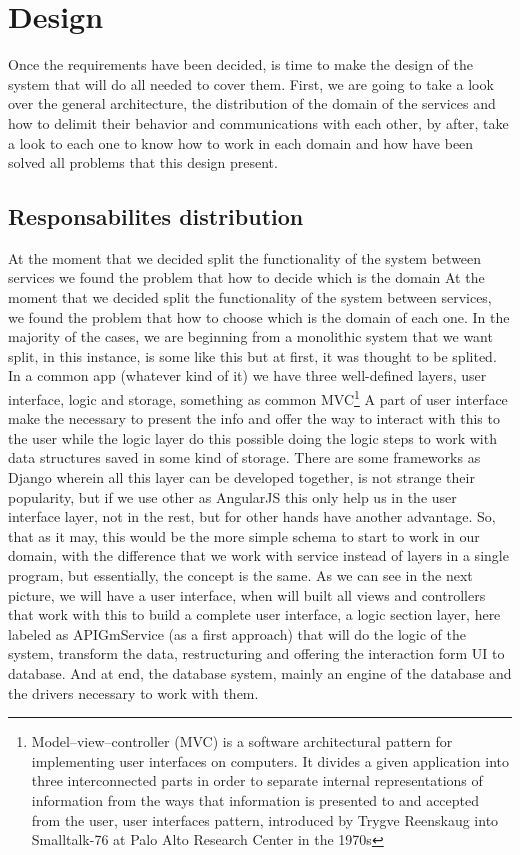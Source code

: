 \chapter{Design}

Once the requirements have been decided, is time to make the design of the system
that will do all needed to cover them. First, we are going to take a look over
the general architecture, the distribution of the domain of the services and
how to delimit their behavior and communications with each other, by after,
take a look to each one to know how to work in each domain and how have been solved all problems
that this design present.

\section{Responsabilites distribution}

At the moment that we decided split the functionality of the system between
services we found the problem that how to decide which is the domain
\intro
At the moment that we decided split the functionality of the system between
services, we found the problem that how to choose which is the domain of each one.
In the majority of the cases, we are beginning from a monolithic system that we
want split, in this instance, is some like this but at first, it was thought to be splited.
\intro
In a common app (whatever kind of it) we have three well-defined layers, user
interface, logic and storage, something as common MVC\footnote{Model–view–controller
(MVC) is a software architectural pattern for implementing user interfaces on
computers. It divides a given application into three interconnected parts in
order to separate internal representations of information from the ways that
information is presented to and accepted from the user, user interfaces pattern,
introduced by Trygve Reenskaug into Smalltalk-76 at Palo Alto Research Center in the 1970s}
A part of user interface make the necessary to present the info and offer the
way to interact with this to the user while the logic layer do this possible
doing the logic steps to work with data structures saved in some kind of storage.
\intro
There are some frameworks as Django wherein all this layer can be developed
together, is not strange their popularity, but if we use other as AngularJS
this only help us in the user interface layer, not in the rest, but for other
hands have another advantage.
\intro
So, that as it may, this would be the more simple schema to start to work in
our domain, with the difference that we work with service instead of layers in a
single program, but essentially, the concept is the same.
\intro
As we can see in the next picture, we will have a user interface, when  will
built all views and controllers that work with this to build a complete user
interface, a logic section layer, here labeled as APIGmService (as a first
approach) that will do the logic of the system, transform the data,
restructuring and offering the interaction form UI to database.
And at end, the database system, mainly an engine of the database and the drivers
necessary to work with them.

